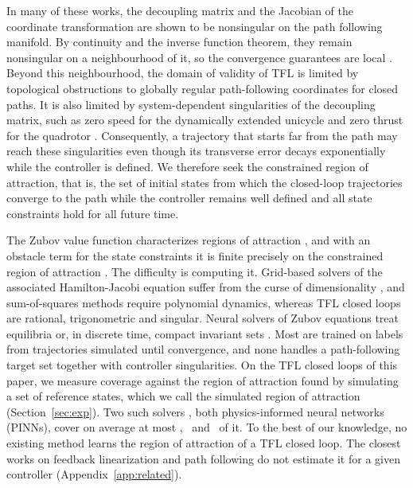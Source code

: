 \documentclass{l4dc2027}
\begin{document}
 In many of these works, the decoupling matrix and the Jacobian of the coordinate transformation are shown to be nonsingular on the path following manifold. By continuity and the inverse function theorem, they remain nonsingular on a neighbourhood of it, so the convergence guarantees are local \citep{nielsen2008,akhtar2015}. Beyond this neighbourhood, the domain of validity of TFL is limited by topological obstructions to globally regular path-following coordinates for closed paths. It is also limited by system-dependent singularities of the decoupling matrix, such as zero speed for the dynamically extended unicycle and zero thrust for the quadrotor \citep{nielsen2006,akhtar2015,allawati2026}. Consequently, a trajectory that starts far from the path may reach these singularities even though its transverse error decays exponentially while the controller is defined. We therefore seek the constrained region of attraction, that is, the set of initial states from which the closed-loop trajectories converge to the path while the controller remains well defined and all state constraints hold for all future time.

 The Zubov value function characterizes regions of attraction \citep{camilli2001}, and with an obstacle term for the state constraints it is finite precisely on the constrained region of attraction \citep{gruene2015}. The difficulty is computing it. Grid-based solvers of the associated Hamilton-Jacobi equation suffer from the curse of dimensionality \citep{mitchell2005}, and sum-of-squares methods \citep{xue2020} require polynomial dynamics, whereas TFL closed loops are rational, trigonometric and singular. Neural solvers of Zubov equations treat equilibria or, in discrete time, compact invariant sets \citep{liu2025,kang2023,mengliu2026,serry2025,serry2026,meng2024}. Most are trained on labels from trajectories simulated until convergence, and none handles a path-following target set together with controller singularities. On the TFL closed loops of this paper, we measure coverage against the region of attraction found by simulating a set of reference states, which we call the simulated region of attraction (Section~\ref{sec:exp}). Two such solvers \citep{liu2025,mengliu2026}, both physics-informed neural networks (PINNs), cover on average at most \resPinnBothMaxCirc, \resPinnBothMaxSin\ and \resPinnBothMaxQuad\ of it. To the best of our knowledge, no existing method learns the region of attraction of a TFL closed loop. The closest works on feedback linearization and path following \citep{oishi2006,faulwasser2016} do not estimate it for a given controller (Appendix~\ref{app:related}).
\end{document}
